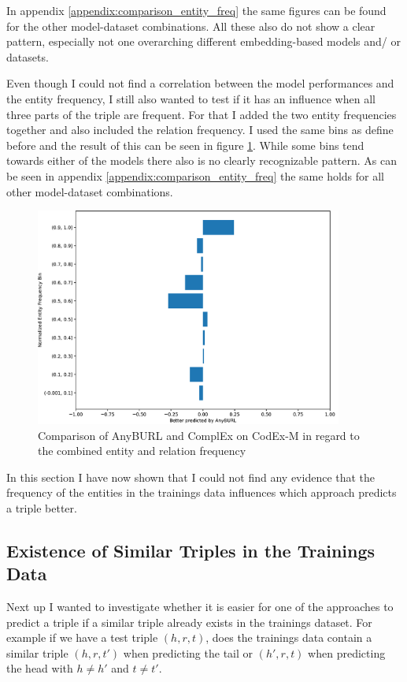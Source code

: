 In appendix \ref{appendix:comparison_entity_freq} the same figures can be found for the other model-dataset combinations. All these also do not show a clear pattern, especially not one overarching different embedding-based models and/ or datasets. 

Even though I could not find a correlation between the model performances and the entity frequency, I still also wanted to test if it has an influence when all three parts of the triple are frequent. For that I added the two entity frequencies together and also included the relation frequency. I used the same bins as define before and the result of this can be seen in figure \ref{fig:combined_freq_anyburl_complex_codex}. While some bins tend towards either of the models there also is no clearly recognizable pattern. As can be seen in appendix \ref{appendix:comparison_entity_freq} the same holds for all other model-dataset combinations.

\begin{figure}[H]
\centering
\includegraphics[width=0.9\textwidth]{images/combined_freq_anyburl_complex_codex.PNG}
\caption{Comparison of AnyBURL and ComplEx on CodEx-M in regard to the combined entity and relation frequency}
\label{fig:combined_freq_anyburl_complex_codex}
\end{figure}

In this section I have now shown that I could not find any evidence that the frequency of the entities in the trainings data influences which approach predicts a triple better.

\subsection{Existence of Similar Triples in the Trainings Data}
\label{sec:similar_triple_exist}
Next up I wanted to investigate whether it is easier for one of the approaches to predict a triple if a similar triple already exists in the trainings dataset. 
For example if we have a test triple $(h,r,t)$, does the trainings data contain a similar triple $(h,r,t')$ when predicting the tail or $(h',r,t)$ when predicting the head with $h\neq h'$ and $t\neq t'$. 

